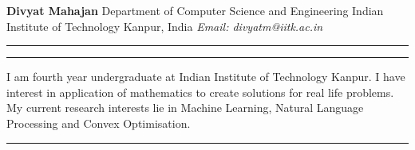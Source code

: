 \documentclass[a4paper, 10pt]{article}
\begin{document}
\noindent\hspace*{1.5ex}\textbf{Divyat Mahajan} \newline
\hspace*{1.5ex}Department of Computer Science and Engineering \newline
\hspace*{1.5ex}Indian Institute of Technology Kanpur, India \newline
\hspace*{1.5ex}\textit{Email: divyatm@iitk.ac.in} \newline

\noindent\rule{\textwidth}{0.1pt}

\vspace{-3mm}

\noindent\rule{\textwidth}{0.1pt}

\vspace{0.1mm}

\noindent I am fourth year undergraduate at Indian Institute of Technology Kanpur. I have interest in application of mathematics to create solutions for real life problems. My current research interests lie in Machine Learning, Natural Language Processing and Convex Optimisation.
\vspace{-2.1mm}

\noindent\rule{\textwidth}{0.1pt}

\vspace{-3mm}
\end{document}
